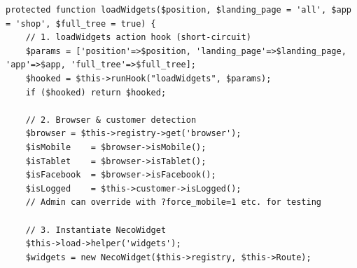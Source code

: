 \documentclass[11pt,a4paper]{article}
\begin{document}
\begin{lstlisting}[caption={\texttt{Controller::loadWidgets()} --- the widget-loading seam (abridged).},label={lst:loadwidgets}]
protected function loadWidgets($position, $landing_page = 'all', $app = 'shop', $full_tree = true) {
    // 1. loadWidgets action hook (short-circuit)
    $params = ['position'=>$position, 'landing_page'=>$landing_page, 'app'=>$app, 'full_tree'=>$full_tree];
    $hooked = $this->runHook("loadWidgets", $params);
    if ($hooked) return $hooked;

    // 2. Browser & customer detection
    $browser = $this->registry->get('browser');
    $isMobile    = $browser->isMobile();
    $isTablet    = $browser->isTablet();
    $isFacebook  = $browser->isFacebook();
    $isLogged    = $this->customer->isLogged();
    // Admin can override with ?force_mobile=1 etc. for testing

    // 3. Instantiate NecoWidget
    $this->load->helper('widgets');
    $widgets = new NecoWidget($this->registry, $this->Route);


\end{lstlisting}
\end{document}

